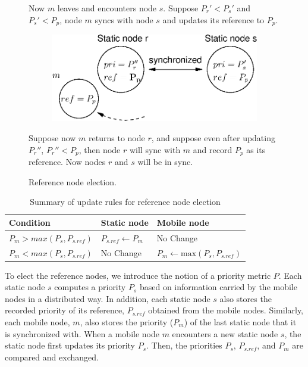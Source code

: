 \documentclass[twoside,twocolumn]{article}
\begin{document}
\begin{figure}[t]
{      Now $m$ leaves and encounters node $s$. Suppose $P_r'<P_s'$
      and $P_s'<P_p$, node $m$ syncs with node $s$ and updates its
      reference to $P_p$.\\}
  \begin{subfigure}
      \centering
      \includegraphics[scale=0.55]{figs/illustration-4}
  \end{subfigure}
      \parbox{.8\columnwidth}
      {\smallskip\scriptsize
      Suppose now $m$ returns to node $r$, and suppose even after
      updating $P_r''$, $P_r''<P_p$, then node $r$ will sync with $m$
      and record $P_p$ as its reference. Now nodes $r$ and $s$ will be
      in sync.\\}
  \caption{Reference node election.} 
  \label{fig:selection}
\end{figure}

\begin{table}[t]\scriptsize
   \centering
   \caption{Summary of update rules for reference node election}
   \begin{tabularx}{\columnwidth}{@{}lll@{}}
     \toprule
     Condition & Static node & Mobile node \\
     \midrule
       $P_{m} > max(P_{s}, P_{s.ref})$ & $P_{s.ref} \leftarrow P_m$ & No Change \\
       $P_{m}<max(P_{s}, P_{s.ref})$ & No Change & $P_m \leftarrow \textrm{max}(P_s, P_{s.ref})$ \\
     \bottomrule
   \end{tabularx}
   \label{tab:priority}
\end{table}

To elect the reference nodes, we introduce the notion of a priority
metric $P$.  Each static node $s$ computes a priority $P_s$ based on
information carried by the mobile nodes in a distributed way. In
addition, each static node $s$ also stores the recorded priority of
its reference, $P_{s.ref}$ obtained from the mobile nodes. Similarly,
each mobile node, $m$, also stores the priority ($P_m$) of the last
static node that it is synchronized with. When a mobile node $m$
encounters a new static node $s$, the static node first updates its
priority $P_s$. Then, the priorities $P_s$, $P_{s.ref}$, and $P_m$ are
compared and exchanged.
\end{document}
